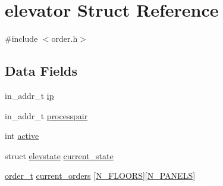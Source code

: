 \hypertarget{structelevator}{\section{elevator Struct Reference}
\label{structelevator}
}


{\ttfamily \#include $<$order.\-h$>$}

\subsection*{Data Fields}
\begin{DoxyCompactItemize}
\item 
in\-\_\-addr\-\_\-t \hyperlink{structelevator_a576f19065d49f151479e4fd2df18670b}{ip}
\item 
in\-\_\-addr\-\_\-t \hyperlink{structelevator_a75130e4f928affbd1f4fa96bde8ca404}{processpair}
\item 
int \hyperlink{structelevator_aa5805c5e936174e5092bf7a5b78e7e64}{active}
\item 
struct \hyperlink{structelevstate}{elevstate} \hyperlink{structelevator_ac3557e8a9efc9856e2ecb6976579a4a8}{current\-\_\-state}
\item 
\hyperlink{structorder__t}{order\-\_\-t} \hyperlink{structelevator_a20607bdcd87be2326f86a21a642ec6bd}{current\-\_\-orders} \mbox{[}\hyperlink{elevator_8h_ae0592e3739e5e1e76234bb1caf9d1305}{N\-\_\-\-F\-L\-O\-O\-R\-S}\mbox{]}\mbox{[}\hyperlink{elevator_8h_a8409515e250357c28eff995fd872f1ec}{N\-\_\-\-P\-A\-N\-E\-L\-S}\mbox{]}
\end{DoxyCompactItemize}



